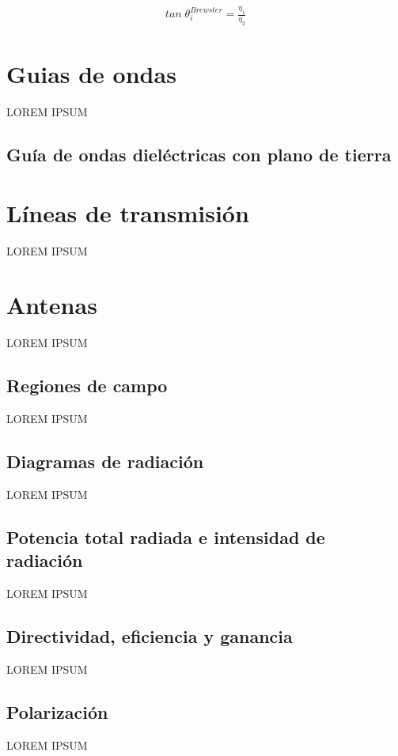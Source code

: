 \begin{align}
	\label{eq:Brewster_angle}
	tan\;\theta_i^{Brewster} = \frac{\eta_1}{\eta_2}
\end{align}


\section{Guias de ondas}
\label{subsec_guias_de_ondas}
LOREM IPSUM

\subsection{Guía de ondas dieléctricas con plano de tierra}




\section{Líneas de transmisión}
\label{subsec_lineas_de_transmision}
LOREM IPSUM
\section{Antenas}
\label{subsec_antenas}
LOREM IPSUM
\subsection{Regiones de campo}
\label{subsubsec_regiones_de_campo}
LOREM IPSUM
\subsection{Diagramas de radiación}
\label{subsubsec_diag_de_rad}
LOREM IPSUM
\subsection{Potencia total radiada e intensidad de radiación}
\label{subsubsec_pot_total_radiada}
LOREM IPSUM
\subsection{Directividad, eficiencia y ganancia}
\label{subsubsec_directividad}
LOREM IPSUM
\subsection{Polarización}
\label{subsubsec_polarizacion}
LOREM IPSUM

